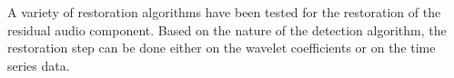A variety of restoration algorithms have been tested for the restoration of the residual audio component. Based on the nature of the detection algorithm, the restoration step can be done either on the wavelet coefficients or on the time series data.












